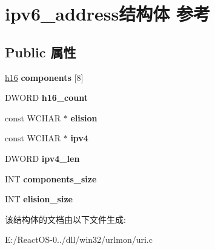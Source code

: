 \hypertarget{structipv6__address}{}\section{ipv6\+\_\+address结构体 参考}
\label{structipv6__address}
\subsection*{Public 属性}
\begin{DoxyCompactItemize}
\item 
\mbox{\label{structipv6__address_a5e25c7dcbc1f9ef8ae7160cd49a6167b}} 
\hyperlink{structh16}{h16} {\bfseries components} \mbox{[}8\mbox{]}
\item 
\mbox{\label{structipv6__address_ae00b75a9643ecf8ec827e95b302fd17e}} 
D\+W\+O\+RD {\bfseries h16\+\_\+count}
\item 
\mbox{\label{structipv6__address_ab269cbdd7a61ff3616e22dd50f5d7c6d}} 
const W\+C\+H\+AR $\ast$ {\bfseries elision}
\item 
\mbox{\label{structipv6__address_a262fbae45450af62f4c066a642ae3cdd}} 
const W\+C\+H\+AR $\ast$ {\bfseries ipv4}
\item 
\mbox{\label{structipv6__address_a1442de1adf6e887cfc8ddc69a26d71d4}} 
D\+W\+O\+RD {\bfseries ipv4\+\_\+len}
\item 
\mbox{\label{structipv6__address_a0c4eb024dfaf9c9cb3294c65eb5694b0}} 
I\+NT {\bfseries components\+\_\+size}
\item 
\mbox{\label{structipv6__address_af756e5ed1a9cefbbb32e911888a489d5}} 
I\+NT {\bfseries elision\+\_\+size}
\end{DoxyCompactItemize}


该结构体的文档由以下文件生成\+:\begin{DoxyCompactItemize}
\item 
E\+:/\+React\+O\+S-\/0../dll/win32/urlmon/uri.\+c\end{DoxyCompactItemize}
